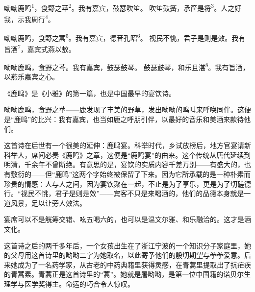 
\begin{poem}
呦呦鹿鸣\textsuperscript{1}，食野之苹\textsuperscript{2}。我有嘉宾，鼓瑟吹笙。
吹笙鼓簧，承筐是将\textsuperscript{3}。人之好我，示我周行\textsuperscript{4}。

呦呦鹿鸣，食野之蒿\textsuperscript{5}。我有嘉宾，德音孔昭\textsuperscript{6}。
视民不恌，君子是则是效。我有旨酒\textsuperscript{7}，嘉宾式燕以敖。

呦呦鹿鸣，食野之芩。我有嘉宾，鼓瑟鼓琴。
鼓瑟鼓琴，和乐且湛\textsuperscript{8}。我有旨酒，以燕乐嘉宾之心。
\end{poem}

\begin{annotations}
\end{annotations}

\begin{appreciation}
《鹿鸣》是《小雅》的第一篇，也是中国最早的宴饮诗。

呦呦鹿鸣，食野之苹——鹿发现了丰美的野草，发出呦呦的鸣叫来呼唤同伴。这便是“鹿鸣”的比兴：我有嘉宾，也当如鹿之呼朋引伴，以最好的音乐和美酒来款待他们。

这首诗在后世有一个很美的延伸：鹿鸣宴。科举时代，乡试放榜后，地方官宴请新科举人，席间必奏《鹿鸣》之章，这便是“鹿鸣宴”的由来。这个传统从唐代延续到明清，千余年不曾断绝。有意思的是，宴饮的实质内容千差万别——有盛大的，也有敷衍的——但“鹿鸣”这两个字始终被保留了下来。因为它所承载的是一种朴素而珍贵的情感：人与人之间，因为宴饮聚在一起，不止是为了享乐，更是为了切磋德行。“视民不恌，君子是则是效”——宾客不只是来喝酒的，他们的品德本身就是一道风景，足以让旁人效法。

宴席可以不是觥筹交错、吆五喝六的，也可以是温文尔雅、和乐融洽的。这才是酒文化。

这首诗之后的两千多年后，一个女孩出生在了浙江宁波的一个知识分子家庭里，她的父母用这首诗里的哟哟二字为她取名，以此寄予他们的殷切期望与拳拳爱意。后来她成为了一名药学家，从古老的中药典籍里获得灵感，在青蒿里提取出了抗疟疾的青蒿素。青蒿正是这首诗里的“蒿”。她就是屠哟哟，是第一位中国籍的诺贝尔生理学与医学奖得主。命运的巧合令人惊叹。
\end{appreciation}
